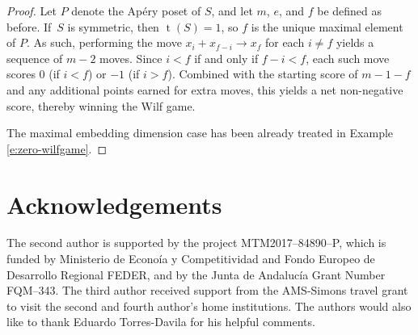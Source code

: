 \documentclass[12pt]{amsart}
\theoremstyle{definition}
\numberwithin{equation}{section}
\renewcommand\>{\rangle}
\newcommand\<{\langle}
\newcommand\0{\mathbf{0}}
\begin{document}
\begin{proof}
Let $P$ denote the Ap\'ery poset of $S$, and let $m$, $e$, and $f$ be defined as before.  If~$S$ is symmetric, then $\operatorname{t}(S) = 1$, so $f$ is the unique maximal element of $P$.  As such, performing the move $x_i + x_{f - i} \to x_f$ for each $i \ne f$ yields a sequence of $m - 2$ moves.  Since $i < f$ if and only if $f - i < f$, each such move scores 0 (if $i < f$) or $-1$ (if $i > f$).  Combined with the starting score of $m - 1 - f$ and any additional points earned for extra moves, this yields a net non-negative score, thereby winning the Wilf game.  

The maximal embedding dimension case has been already treated in Example \ref{e:zero-wilfgame}.  
\end{proof}



\section{Acknowledgements}%

The second author is supported by the project MTM2017--84890--P, which is funded by Ministerio de Econo\'ia y Competitividad and Fondo Europeo de Desarrollo Regional FEDER, and by the Junta de Andaluc\'ia Grant Number FQM--343.  The third author received support from the AMS-Simons travel grant to visit the second and fourth author's home institutions.  
The authors would also like to thank Eduardo Torres-Davila for his helpful comments.  
\end{document}

